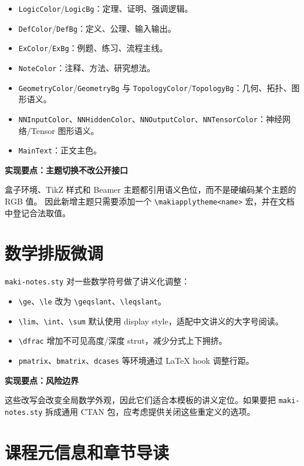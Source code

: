 \documentclass[a4paper,11pt]{ltxdoc}
\newcommand{\mfile}[1]{\texttt{#1}}
\newcommand{\menv}[1]{\texttt{#1}}
\newcommand{\mcmd}[1]{\texttt{\textbackslash#1}}
\newcommand{\mkey}[1]{\texttt{#1}}
\newenvironment{implementation}[1]
  {\par\medskip\noindent\textbf{\color{MakiBlue}实现要点：#1}\par\smallskip}
  {\par\medskip}
\begin{document}
\begin{itemize}
\item \mkey{LogicColor}/\mkey{LogicBg}：定理、证明、强调逻辑。
\item \mkey{DefColor}/\mkey{DefBg}：定义、公理、输入输出。
\item \mkey{ExColor}/\mkey{ExBg}：例题、练习、流程主线。
\item \mkey{NoteColor}：注释、方法、研究想法。
\item \mkey{GeometryColor}/\mkey{GeometryBg} 与 \mkey{TopologyColor}/\mkey{TopologyBg}：几何、拓扑、图形语义。
\item \mkey{NNInputColor}、\mkey{NNHiddenColor}、\mkey{NNOutputColor}、\mkey{NNTensorColor}：神经网络/Tensor 图形语义。
\item \mkey{MainText}：正文主色。
\end{itemize}

\begin{implementation}{主题切换不改公开接口}
盒子环境、TikZ 样式和 Beamer 主题都引用语义色位，而不是硬编码某个主题的 RGB 值。
因此新增主题只需要添加一个 \mcmd{makiapplytheme<name>} 宏，并在文档中登记合法取值。
\end{implementation}

\section{数学排版微调}

\mfile{maki-notes.sty} 对一些数学符号做了讲义化调整：

\begin{itemize}
\item \mcmd{ge}、\mcmd{le} 改为 \mcmd{geqslant}、\mcmd{leqslant}。
\item \mcmd{lim}、\mcmd{int}、\mcmd{sum} 默认使用 display style，适配中文讲义的大字号阅读。
\item \mcmd{dfrac} 增加不可见高度/深度 strut，减少分式上下拥挤。
\item \menv{pmatrix}、\menv{bmatrix}、\menv{dcases} 等环境通过 LaTeX hook 调整行距。
\end{itemize}

\begin{implementation}{风险边界}
这些改写会改变全局数学外观，因此它们适合本模板的讲义定位。如果要把 \mfile{maki-notes.sty}
拆成通用 CTAN 包，应考虑提供关闭这些重定义的选项。
\end{implementation}

\section{课程元信息和章节导读}
\end{document}
